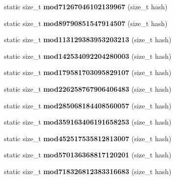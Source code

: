 \begin{DoxyCompactItemize}
\item 
static size\+\_\+t {\bfseries mod71267046102139967} (size\+\_\+t hash)\label{structska_1_1prime__number__hash__policy_a5ba2aa114a5f25d380cfeb997388d492}

\item 
static size\+\_\+t {\bfseries mod89790851547914507} (size\+\_\+t hash)\label{structska_1_1prime__number__hash__policy_a3e9edda855f32e0b9118c23ff6ea792f}

\item 
static size\+\_\+t {\bfseries mod113129383953203213} (size\+\_\+t hash)\label{structska_1_1prime__number__hash__policy_aa7c1832a5fa1adf4f0811d57d9fdb948}

\item 
static size\+\_\+t {\bfseries mod142534092204280003} (size\+\_\+t hash)\label{structska_1_1prime__number__hash__policy_a99891d42796927b8ace044db6aa7b5d6}

\item 
static size\+\_\+t {\bfseries mod179581703095829107} (size\+\_\+t hash)\label{structska_1_1prime__number__hash__policy_ab53cb7552eaa1daabdfb36d22633c143}

\item 
static size\+\_\+t {\bfseries mod226258767906406483} (size\+\_\+t hash)\label{structska_1_1prime__number__hash__policy_ac0d9a3b12495e9918a802de0e6be33f2}

\item 
static size\+\_\+t {\bfseries mod285068184408560057} (size\+\_\+t hash)\label{structska_1_1prime__number__hash__policy_ab38c272dbb2ec66c318717749d7ace5c}

\item 
static size\+\_\+t {\bfseries mod359163406191658253} (size\+\_\+t hash)\label{structska_1_1prime__number__hash__policy_ab30f591033e9631e8361a711b5e263bb}

\item 
static size\+\_\+t {\bfseries mod452517535812813007} (size\+\_\+t hash)\label{structska_1_1prime__number__hash__policy_a2af66d332fa7f9524ba8f2dea27ef28d}

\item 
static size\+\_\+t {\bfseries mod570136368817120201} (size\+\_\+t hash)\label{structska_1_1prime__number__hash__policy_a88c6a57b9d50ec3fbc1efb25206b558c}

\item 
static size\+\_\+t {\bfseries mod718326812383316683} (size\+\_\+t hash)\label{structska_1_1prime__number__hash__policy_ae202bd8b437932546ec69d6bff2aa1de}


\end{DoxyCompactItemize}
